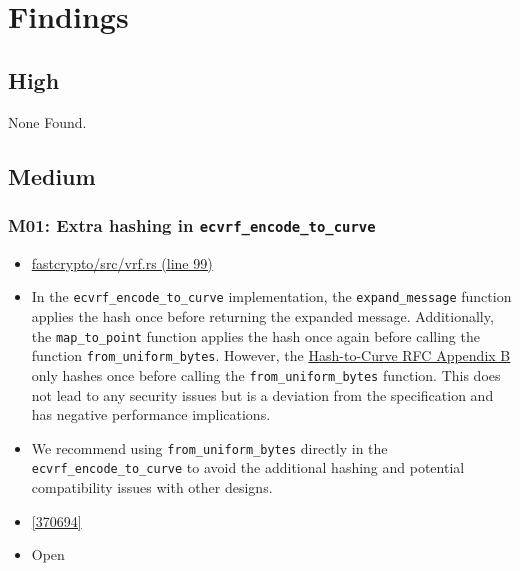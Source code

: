\section{Findings}
\subsection{High}
    None Found.
\subsection{Medium}

\subsubsection*{M01: Extra hashing in \lstinline{ecvrf_encode_to_curve}}
\begin{itemize}[align=left]
    \item[\textbf{Affected Code:}] \href{https://github.com/MystenLabs/fastcrypto/blob/963205c6d0538fe548b8b10037cf87a53af6f424/fastcrypto/src/vrf.rs#L99}{fastcrypto/src/vrf.rs (line 99)}
    \item[\textbf{Summary:}] In the \lstinline{ecvrf_encode_to_curve} implementation, the \lstinline{expand_message} function applies the hash once before returning the expanded message. Additionally, the \lstinline{map_to_point} function applies the hash once again before calling the function \lstinline{from_uniform_bytes}. However, the \href{https://datatracker.ietf.org/doc/html/draft-irtf-cfrg-hash-to-curve-16#name-hashing-to-ristretto255}{Hash-to-Curve RFC Appendix B} only hashes once before calling the \lstinline{from_uniform_bytes} function. This does not lead to any security issues but is a deviation from the specification and has negative performance implications.
    \item[\textbf{Suggestion:}] We recommend using \lstinline{from_uniform_bytes} directly in the \lstinline{ecvrf_encode_to_curve} to avoid the additional hashing and potential compatibility issues with other designs.
    \item[\textbf{Suggested Fix:}] \href{https://github.com/MystenLabs/fastcrypto/pull/543/commits/370694eeffed74a57c816758d472640e4011ae7e}{[370694]}
    \item[\textbf{Status:}] Open
\end{itemize}

